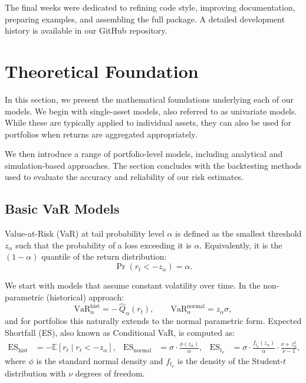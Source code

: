 \documentclass{article}
\begin{document}
The final weeks were dedicated to refining code style, improving documentation, preparing examples, and assembling the full package.  
A detailed development history is available in our GitHub repository.


\section{Theoretical Foundation}

In this section, we present the mathematical foundations underlying each of our models. We begin with single-asset models, also referred to as univariate models. While these are typically applied to individual assets, they can also be used for portfolios when returns are aggregated appropriately.

We then introduce a range of portfolio-level models, including analytical and simulation-based approaches. The section concludes with the backtesting methods used to evaluate the accuracy and reliability of our risk estimates.


\subsection{Basic VaR Models}

Value-at-Risk (VaR) at tail probability level $\alpha$ is defined as the smallest threshold $z_{\alpha}$ such that the probability of a loss exceeding it is $\alpha$. Equivalently, it is the $(1 - \alpha)$ quantile of the return distribution:
\[
\Pr\left(r_t < -z_{\alpha}\right) = \alpha.
\]


We start with models that assume constant volatility over time. In the non-parametric (historical) approach:
\[
\mathrm{VaR}_{\alpha}^{\mathrm{hist}} = -\,\widehat{Q}_{\alpha}(r_t), \qquad
\mathrm{VaR}_{\alpha}^{\mathrm{normal}} = z_{\alpha} \sigma,
\]
and for portfolios this naturally extends to the normal parametric form. Expected Shortfall (ES), also known as Conditional VaR, is computed as:
\[
\begin{aligned}
\mathrm{ES}_{\mathrm{hist}} &= -\mathbb{E}\left[r_t \mid r_t < -z_{\alpha}\right], &
\mathrm{ES}_{\mathrm{normal}} &= \sigma \cdot \frac{\phi(z_{\alpha})}{\alpha}, &
\mathrm{ES}_{t_\nu} &= \sigma \cdot \frac{f_{t_\nu}(z_{\alpha})}{\alpha} \cdot \frac{\nu + z_{\alpha}^2}{\nu - 1},
\end{aligned}
\]
where $\phi$ is the standard normal density and $f_{t_\nu}$ is the density of the Student-$t$ distribution with $\nu$ degrees of freedom.
\end{document}

